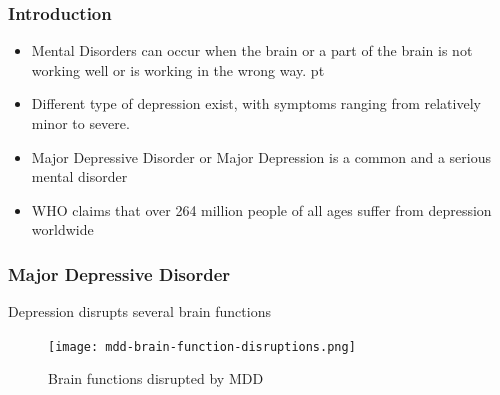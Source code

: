 \documentclass{beamer}
\begin{document}
\endgroup

\begingroup

\addtocounter{framenumber}{-2}

  \begin{frame}[t]
    \frametitle{Introduction}

      \vskip 20pt

    \begin{itemize}

      \item Mental Disorders can occur when the brain or a part of the
        brain is not working well or is working in the wrong
        way.  pt

      \item Different type of depression exist, with symptoms ranging
        from relatively minor to severe. \vskip 10pt

      \item Major Depressive Disorder or Major Depression is a common
        and a serious mental disorder \vskip 10pt

      \item WHO claims that over 264 million people of all ages suffer
        from depression worldwide

    \end{itemize}


  \end{frame}

  \begin{frame}[t]
    \frametitle{Major Depressive Disorder}

      Depression disrupts several brain functions

      \vskip 20pt
    \begin{figure}[H]
      \centering
      \texttt{[image: mdd-brain-function-disruptions.png]}
      \caption{Brain functions disrupted by MDD}
    \end{figure}



  \end{frame}
\end{document}
